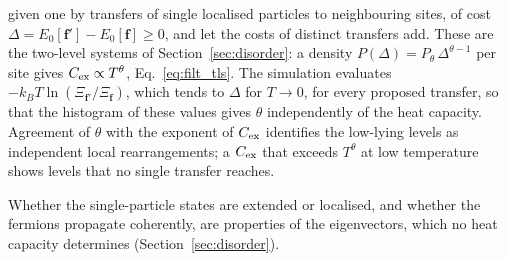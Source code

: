 \documentclass[10pt,a4paper]{article}
\theoremstyle{plain}
\begin{document}
\begin{itemize}
  given one by transfers of single localised particles to neighbouring
  sites, of cost $\Delta=E_0[\mathbf f']-E_0[\mathbf f]\ge0$, and let the
  costs of distinct transfers add. These are the two-level systems of
  Section~\ref{sec:disorder}: a density
  $P(\Delta)=P_\theta\,\Delta^{\theta-1}$ per site gives
  $C_{\rm ex}\propto T^{\theta}$, Eq.~\eqref{eq:filt_tls}. The simulation
  evaluates $-k_BT\ln(\Xi_{\mathbf f'}/\Xi_{\mathbf f})$, which tends to
  $\Delta$ for $T\to0$, for every proposed transfer, so that the histogram of
  these values gives $\theta$ independently of the heat capacity. Agreement
  of $\theta$ with the exponent of $C_{\rm ex}$ identifies the low-lying
  levels as independent local rearrangements; a $C_{\rm ex}$ that exceeds
  $T^{\theta}$ at low temperature shows levels that no single transfer
  reaches.
\end{itemize}
Whether the single-particle states are extended or localised, and whether
the fermions propagate coherently, are properties of the eigenvectors, which
no heat capacity determines (Section~\ref{sec:disorder}).
\end{document}
